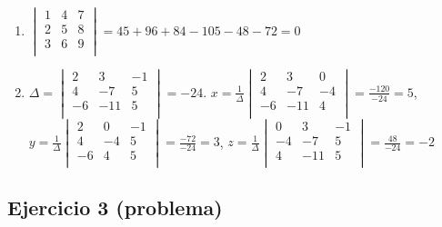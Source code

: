 \begin{enumerate}
\item $\begin{vmatrix}
  1 & 4 & 7 \\
  2 & 5 & 8 \\
  3 & 6 & 9 \\
 \end{vmatrix} = 45 + 96 + 84 - 105 - 48 - 72 = 0$
\item $\Delta =
\begin{vmatrix}
  2 & 3 & -1 \\
  4 & -7 & 5 \\
  -6 & -11 & 5 \\
 \end{vmatrix} =
 -24$. $x = \frac{1}{\Delta} \begin{vmatrix}
   2 & 3 & 0 \\
   4 & -7 & -4 \\
   -6 & -11 & 4 \\
 \end{vmatrix} = \frac{-120}{-24} = 5$,
  $y = \frac{1}{\Delta} \begin{vmatrix}
   2 & 0 & -1 \\
   4 & -4 & 5\\
   -6 & 4 & 5 \\
 \end{vmatrix} = \frac{-72}{-24} = 3$,
 $z = \frac{1}{\Delta} \begin{vmatrix}
   0 & 3 & -1 \\
   -4 & -7 & 5\\
   4 & -11 & 5 \\
 \end{vmatrix} = \frac{48}{-24} = -2$
\end{enumerate}

\subsection*{Ejercicio 3 (problema)}

